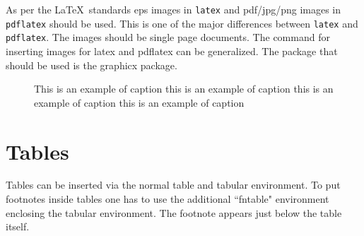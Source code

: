 \documentclass[autowc]{CUP-JNL-PPS}
\begin{document}
As per the \LaTeX\ standards eps images in \verb!latex! and pdf/jpg/png images in
\verb!pdflatex! should be used. This is one of the major differences between \verb!latex!
and \verb!pdflatex!. The images should be single page documents. The command for inserting images
for latex and pdflatex can be generalized. The package that should be used
is the graphicx package.

\begin{figure}[t]%
{\caption{This is an example of caption this is an example of caption  this is an example of caption this is an example of caption}
\label{fig1}}
\end{figure}



\section{Tables}

Tables can be inserted via the normal table and tabular environment. To put
footnotes inside tables one has to use the additional ``fntable" environment
enclosing the tabular environment. The footnote appears just below the table
itself.
\end{document}
